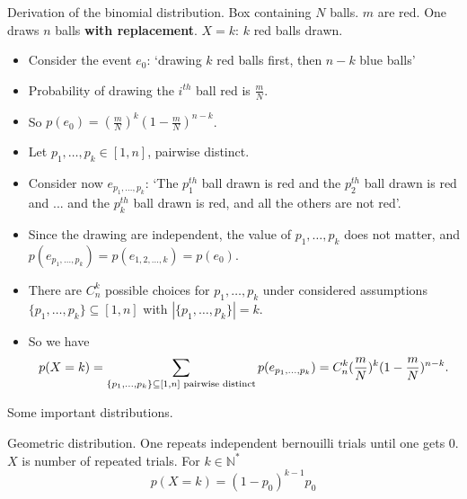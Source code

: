 \documentclass{beamer}
\begin{document}
\begin{frame}{Derivation of the binomial distribution.}
  Box containing $N$ balls. $m$ are red. One draws $n$ balls \textbf{with replacement}. $X = k$: $k$ red balls drawn.
  
  \begin{itemize}
  \item Consider the event $e_0$: `drawing $k$ red balls first, then $n-k$ blue balls'
  \item Probability of drawing the $i^{th}$ ball red is $\frac{m}{N}$.
  \item So $p(e_0) = (\frac{m}{N})^k(1-\frac{m}{N})^{n-k}$.
  \item Let $p_1, \dots, p_k \in [1,n]$, pairwise distinct.
  \item Consider now $e_{p_1, \dots, p_k}$: `The $p_1^{th}$ ball drawn is red and the $p_2^{th}$ ball drawn is red and ... and the $p_k^{th}$ ball drawn is red, and all the others are not red'.
  \item Since the drawing are independent, the value of $p_1, \dots, p_k$ does not matter, and $p(e_{p_1, \dots, p_k}) = p(e_{1, 2, \dots, k}) = p(e_0)$.
  \item There are $C^k_n$ possible choices for $p_1, \dots, p_k$ under considered assumptions $\{p_1, \dots, p_k\} \subseteq [1,n]$ with $|\{p_1, \dots, p_k\}| = k$.
  \item So we have \[p(X = k) = \sum_{\{p_1, \dots, p_k\} \subseteq [1,n] \textnormal{ pairwise distinct} } p(e_{p_1, \dots, p_k}) =  C^k_n (\frac{m}{N})^k(1-\frac{m}{N})^{n-k}.\]
  \end{itemize}
  
\end{frame}



\begin{frame}{Some important distributions.}
  \begin{exampleblock}{Geometric distribution.}
    One repeats independent bernouilli trials until one gets $0$. $X$ is number of repeated trials. For $k \in \mathbb{N}^*$
    \[p(X = k) = (1 - p_0)^{k-1}p_0\]
    
  \end{exampleblock}
\end{frame}
\end{document}
